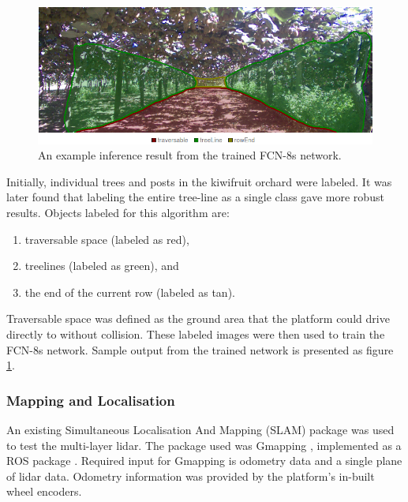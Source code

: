 \documentclass[preprint,authoryear,12pt]{elsarticle}
\begin{document}
        \begin{figure}[htb]
            \centering
            \includegraphics[width=\linewidth]{imgs/photos/semSegRowResults.png}
            \caption{
                An example inference result from the trained FCN-8s network.
            }
            \label{fig:semSegRowResults}
        \end{figure}

        Initially, individual trees and posts in the kiwifruit orchard were labeled.
    	It was later found that labeling the entire tree-line as a single class gave more robust results.
    	Objects labeled for this algorithm are:
        \begin{enumerate}
        \item traversable space (labeled as red),
        \item treelines (labeled as green), and
        \item the end of the current row (labeled as tan).
        \end{enumerate}
        Traversable space was defined as the ground area that the platform could drive directly to without collision.
        These labeled images were then used to train the FCN-8s network.
    	Sample output from the trained network is presented as figure \ref{fig:semSegRowResults}.

    \subsubsection{Mapping and Localisation}
        An existing Simultaneous Localisation And Mapping (SLAM) package was used to test the multi-layer lidar.
        The package used was Gmapping \citep{Grisetti2007}, implemented as a ROS package \citep{Gerkey2010}.
    	Required input for Gmapping is odometry data and a single plane of lidar data.
        Odometry information was provided by the platform's in-built wheel encoders.
\end{document}
